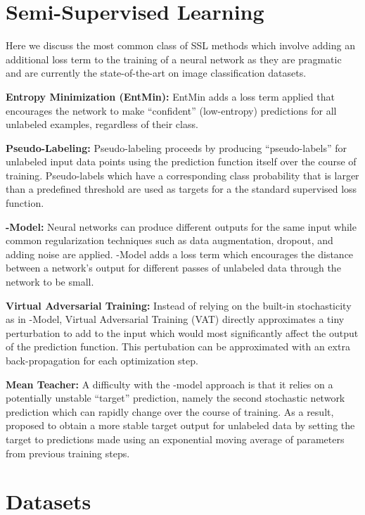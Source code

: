 \documentclass{article} \usepackage{iclr2020_conference,times}
\begin{document}
\section{Semi-Supervised Learning}
Here we discuss the most common class of SSL methods which involve adding an additional loss term to the training of a neural network as they are pragmatic and are currently the state-of-the-art on image classification datasets.

\textbf{Entropy Minimization (EntMin):}
EntMin \cite{grandvalet2005semi} adds a loss term applied that encourages the network to make ``confident'' (low-entropy) predictions for all unlabeled examples, regardless of their class.

\textbf{Pseudo-Labeling:}
Pseudo-labeling \cite{lee2013pseudo} proceeds by producing ``pseudo-labels'' for unlabeled input data points using the prediction function itself over the course of training. Pseudo-labels which have a corresponding class probability that is larger than a predefined threshold are used as targets for a the standard supervised loss function.

\textbf{-Model:}
Neural networks can produce different outputs for the same input while common regularization techniques such as data augmentation, dropout, and adding noise are applied. -Model \cite{laine2016temporal,sajjadi2016mutual} adds a loss term which encourages the distance between a network's output for different passes of unlabeled data through the network to be small.

\textbf{Virtual Adversarial Training:} Instead of relying on the built-in stochasticity as in -Model, Virtual Adversarial Training (VAT) \cite{miyato2018virtual} directly approximates a tiny perturbation to add to the input which would most significantly affect the output of the prediction function. This pertubation can be approximated with an extra back-propagation for each optimization step.

\textbf{Mean Teacher:}
A difficulty with the -model approach is that it relies on a potentially unstable ``target'' prediction, namely the second stochastic network prediction which can rapidly change over the course of training. As a result, \cite{tarvainen2017mean} proposed to obtain a more stable target output for unlabeled data by setting the target to predictions made using an exponential moving average of parameters from previous training steps.

\section{Datasets}
\end{document}
